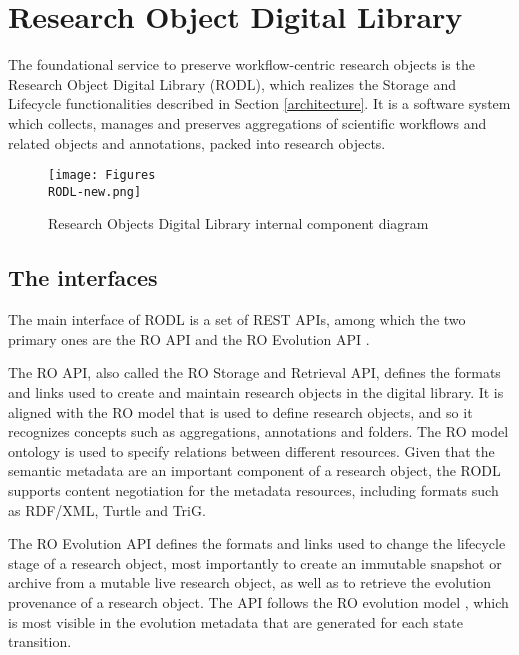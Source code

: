 \section{Research Object Digital Library}
\label{sec:rodl}


The foundational service to preserve workflow-centric research objects is the Research Object Digital Library (RODL), which realizes the Storage and Lifecycle functionalities described in Section \ref{architecture}. It is a software system which collects, manages and preserves aggregations of scientific workflows and related objects and annotations, packed into research objects.

\begin{figure}[!hb]
\centering
\texttt{[image: Figures\\RODL-new.png]}
\caption{Research Objects Digital Library internal component diagram}
\label{RODL}
\end{figure}


\subsection{The interfaces}

The main interface of RODL is a set of REST APIs, among which the two primary ones are the RO API \cite{RO-API} and the RO Evolution API \cite{RO-EVO-API}.

The RO API, also called the RO Storage and Retrieval API, defines the formats and links used to create and maintain research objects in the digital library. It is aligned with the RO model that is used to define research objects, and so it recognizes concepts such as aggregations, annotations and folders. The RO model ontology \cite{RO_model} is used to specify relations between different resources. Given that the semantic metadata are an important component of a research object, the RODL supports content negotiation for the metadata resources, including formats such as RDF/XML, Turtle and TriG.

The RO Evolution API defines the formats and links used to change the lifecycle stage of a research object, most importantly to create an immutable snapshot or archive from a mutable live research object, as well as to retrieve the evolution provenance of a research object. The API follows the RO evolution model \cite{w4fever_d321}, which is most visible in the evolution metadata that are generated for each state transition.

